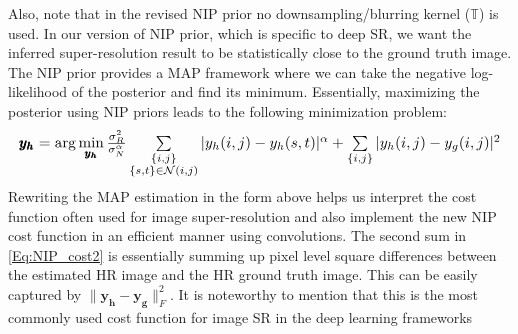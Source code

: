 \documentclass[9pt]{article}
\newcommand{\vect}[1]{\pmb{#1}}
\newcommand{\mat}[1]{\pmb{#1}}
\def\bea{\begin{eqnarray}}
\def\eea{\end{eqnarray}}
\begin{document}
Also, note that in the revised NIP prior no downsampling/blurring kernel ($\mathbb{T}$) is used. In our version of NIP prior, which is specific to deep SR, we want the inferred super-resolution result to be statistically close to the ground truth image. %
The NIP prior provides a MAP framework where we can take the negative log-likelihood of the posterior and find its minimum. Essentially, maximizing the posterior using NIP priors leads to the following minimization problem:
\bea \resizebox{\columnwidth}{!}{$
\vect{y_h}  =   \arg\min\limits_{\vect{y_h}}   \frac{\sigma_R^2}{\sigma_N^\alpha}  \sum\limits_{\substack{\{i,j\} \\ \{s,t\}\in \mathcal{N}(i,j)} }   |y_h(i,j) - y_h(s,t)|^\alpha +
                                   \sum\limits_{ \{i,j\}  }  | y_h(i,j)  - y_g(i,j)|^2
                                   $}
                                   \label{Eq:NIP_cost2}
\eea
Rewriting the MAP estimation in the form above helps us interpret the cost function often used for image super-resolution and also implement the new NIP cost function in an efficient manner using convolutions. The second sum in \eqref{Eq:NIP_cost2} is essentially summing up pixel level square differences between the estimated HR image and the HR ground truth image. This can be easily captured by $\| \mat{y_h}  - \mat{y_g} \|_F^2$. It is noteworthy to mention that this is the most commonly used cost function for image SR in the deep learning frameworks %
\end{document}
